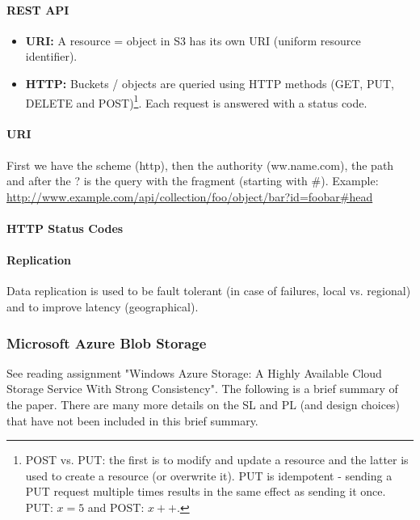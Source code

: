 \paragraph{REST API}
\begin{itemize}
    \item \textbf{URI:} A resource = object in S3 has its own URI (uniform resource identifier).
    \item \textbf{HTTP:} Buckets / objects are queried using HTTP methods (GET, PUT, DELETE and POST)\footnote{POST vs. PUT: the first is to modify and update a resource and the latter is used to create a resource (or overwrite it). PUT is idempotent - sending a PUT request multiple times results in the same effect as sending it once. PUT: $x=5$ and POST: $x++$.}. Each request is answered with a status code.
\end{itemize}

\paragraph{URI} First we have the scheme (http), then the authority (ww.name.com), the path and after the ? is the query with the fragment (starting with \#). Example: \url{http://www.example.com/api/collection/foo/object/bar?id=foobar#head}

\paragraph{HTTP Status Codes}

\paragraph{Replication}
Data replication is used to be fault tolerant (in case of failures, local vs. regional) and to improve latency (geographical).


\subsubsection{Microsoft Azure Blob Storage}

See reading assignment "Windows Azure Storage: A Highly Available Cloud Storage Service With Strong Consistency". The following is a brief summary of the paper. There are many more details on the SL and PL (and design choices) that have not been included in this brief summary.

